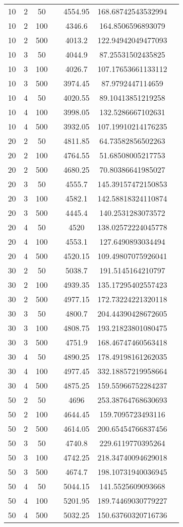 {\begin{longtabu}{S
S
S
S
S
S[round-mode=places, round-precision=0]
S[round-mode=places, round-precision=0]}
10 & 2 & 50 & & 4554.95 & 168.68742543532994 \\
10 & 2 & 100 & & 4346.6 & 164.8506596893079 \\
10 & 2 & 500 & & 4013.2 & 122.94942049477093 \\
10 & 3 & 50 & & 4044.9 & 87.25531502435825 \\
10 & 3 & 100 & & 4026.7 & 107.17653661133112 \\
10 & 3 & 500 & & 3974.45 & 87.9792447114659 \\
10 & 4 & 50 & & 4020.55 & 89.10413851219258 \\
10 & 4 & 100 & & 3998.05 & 132.5286667102631 \\
10 & 4 & 500 & & 3932.05 & 107.19910214176235 \\
20 & 2 & 50 & & 4811.85 & 64.73582856502263 \\
20 & 2 & 100 & & 4764.55 & 51.68508005217753 \\
20 & 2 & 500 & & 4680.25 & 70.80386641985027 \\
20 & 3 & 50 & & 4555.7 & 145.39157472150853 \\
20 & 3 & 100 & & 4582.1 & 142.58818324110874 \\
20 & 3 & 500 & & 4445.4 & 140.2531283073572 \\
20 & 4 & 50 & & 4520 & 138.02572224045778 \\
20 & 4 & 100 & & 4553.1 & 127.6490893034494 \\
20 & 4 & 500 & & 4520.15 & 109.49807075926041 \\
30 & 2 & 50 & & 5038.7 & 191.5145164210797 \\
30 & 2 & 100 & & 4939.35 & 135.17295402557423 \\
30 & 2 & 500 & & 4977.15 & 172.73224221320118 \\
30 & 3 & 50 & & 4800.7 & 204.44390428672605 \\
30 & 3 & 100 & & 4808.75 & 193.21823801080475 \\
30 & 3 & 500 & & 4751.9 & 168.46747460563418 \\
30 & 4 & 50 & & 4890.25 & 178.49198161262035 \\
30 & 4 & 100 & & 4977.45 & 332.18857219958664 \\
30 & 4 & 500 & & 4875.25 & 159.55966752284237 \\
50 & 2 & 50 & & 4696 & 253.38764768630693 \\
50 & 2 & 100 & & 4644.45 & 159.7095723493116 \\
50 & 2 & 500 & & 4614.05 & 200.65454766837456 \\
50 & 3 & 50 & & 4740.8 & 229.6119770395264 \\
50 & 3 & 100 & & 4742.25 & 218.34740094629018 \\
50 & 3 & 500 & & 4674.7 & 198.10731940036945 \\
50 & 4 & 50 & & 5044.15 & 141.5525609093668 \\
50 & 4 & 100 & & 5201.95 & 189.74469030779227 \\
50 & 4 & 500 & & 5032.25 & 150.63760320716736 \\
\hline
\end{longtabu}

}